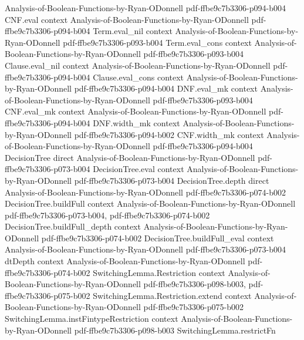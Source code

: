 \begin{lemma}
  {Analysis-of-Boolean-Functions-by-Ryan-ODonnell}
  {pdf-ffbe9c7b3306-p094-b004}
\proofstep
  {CNF.eval}
  {context}
  {Analysis-of-Boolean-Functions-by-Ryan-ODonnell}
  {pdf-ffbe9c7b3306-p094-b004}
\proofstep
  {Term.eval_nil}
  {context}
  {Analysis-of-Boolean-Functions-by-Ryan-ODonnell}
  {pdf-ffbe9c7b3306-p093-b004}
\proofstep
  {Term.eval_cons}
  {context}
  {Analysis-of-Boolean-Functions-by-Ryan-ODonnell}
  {pdf-ffbe9c7b3306-p093-b004}
\proofstep
  {Clause.eval_nil}
  {context}
  {Analysis-of-Boolean-Functions-by-Ryan-ODonnell}
  {pdf-ffbe9c7b3306-p094-b004}
\proofstep
  {Clause.eval_cons}
  {context}
  {Analysis-of-Boolean-Functions-by-Ryan-ODonnell}
  {pdf-ffbe9c7b3306-p094-b004}
\proofstep
  {DNF.eval_mk}
  {context}
  {Analysis-of-Boolean-Functions-by-Ryan-ODonnell}
  {pdf-ffbe9c7b3306-p093-b004}
\proofstep
  {CNF.eval_mk}
  {context}
  {Analysis-of-Boolean-Functions-by-Ryan-ODonnell}
  {pdf-ffbe9c7b3306-p094-b004}
\proofstep
  {DNF.width_mk}
  {context}
  {Analysis-of-Boolean-Functions-by-Ryan-ODonnell}
  {pdf-ffbe9c7b3306-p094-b002}
\proofstep
  {CNF.width_mk}
  {context}
  {Analysis-of-Boolean-Functions-by-Ryan-ODonnell}
  {pdf-ffbe9c7b3306-p094-b004}
\proofstep
  {DecisionTree}
  {direct}
  {Analysis-of-Boolean-Functions-by-Ryan-ODonnell}
  {pdf-ffbe9c7b3306-p073-b004}
\proofstep
  {DecisionTree.eval}
  {context}
  {Analysis-of-Boolean-Functions-by-Ryan-ODonnell}
  {pdf-ffbe9c7b3306-p073-b004}
\proofstep
  {DecisionTree.depth}
  {direct}
  {Analysis-of-Boolean-Functions-by-Ryan-ODonnell}
  {pdf-ffbe9c7b3306-p074-b002}
\proofstep
  {DecisionTree.buildFull}
  {context}
  {Analysis-of-Boolean-Functions-by-Ryan-ODonnell}
  {pdf-ffbe9c7b3306-p073-b004,
    pdf-ffbe9c7b3306-p074-b002}
\proofstep
  {DecisionTree.buildFull_depth}
  {context}
  {Analysis-of-Boolean-Functions-by-Ryan-ODonnell}
  {pdf-ffbe9c7b3306-p074-b002}
\proofstep
  {DecisionTree.buildFull_eval}
  {context}
  {Analysis-of-Boolean-Functions-by-Ryan-ODonnell}
  {pdf-ffbe9c7b3306-p073-b004}
\proofstep
  {dtDepth}
  {context}
  {Analysis-of-Boolean-Functions-by-Ryan-ODonnell}
  {pdf-ffbe9c7b3306-p074-b002}
\proofstep
  {SwitchingLemma.Restriction}
  {context}
  {Analysis-of-Boolean-Functions-by-Ryan-ODonnell}
  {pdf-ffbe9c7b3306-p098-b003,
    pdf-ffbe9c7b3306-p075-b002}
\proofstep
  {SwitchingLemma.Restriction.extend}
  {context}
  {Analysis-of-Boolean-Functions-by-Ryan-ODonnell}
  {pdf-ffbe9c7b3306-p075-b002}
\proofstep
  {SwitchingLemma.instFintypeRestriction}
  {context}
  {Analysis-of-Boolean-Functions-by-Ryan-ODonnell}
  {pdf-ffbe9c7b3306-p098-b003}
\proofstep
  {SwitchingLemma.restrictFn}

\end{lemma}
